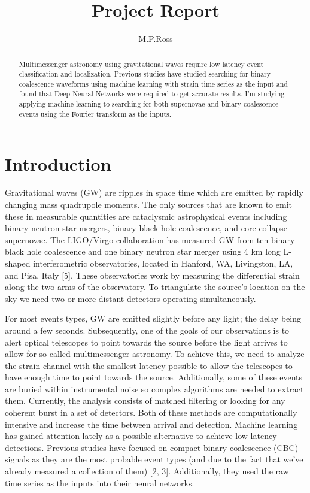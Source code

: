 \documentclass{article}
\title{Project Report}
\author{M.P.Ross}
\begin{document}
\maketitle

\begin{abstract}
Multimessenger astronomy using gravitational waves require low latency event classification and localization. Previous studies have studied searching for binary coalescence waveforms using machine learning with strain time series as the input and found that Deep Neural Networks were required to get accurate results. I'm studying applying machine learning to searching for both supernovae and binary coalescence events using the Fourier transform as the inputs.
\end{abstract}

\section{Introduction}
Gravitational waves (GW) are ripples in space time which are emitted by rapidly changing mass quadrupole moments. The only sources that are known to emit these in measurable quantities are cataclysmic astrophysical events including binary neutron star mergers, binary black hole coalescence, and core collapse supernovae. The LIGO/Virgo collaboration has measured GW from ten binary black hole coalescence and one binary neutron star merger using 4 km long L-shaped interferometric observatories, located in Hanford, WA, Livingston, LA, and Pisa, Italy [5]. These observatories work by measuring the differential strain along the two arms of the observatory. To triangulate the source's location on the sky we need two or more distant detectors operating simultaneously.

For most events types, GW are emitted slightly before any light; the delay being around a few seconds. Subsequently, one of the goals of our observations is to alert optical telescopes to point towards the source before the light arrives to allow for so called multimessenger astronomy. To achieve this, we need to analyze the strain channel with the smallest latency possible to allow the telescopes to have enough time to point towards the source. Additionally, some of these events are buried within instrumental noise so complex algorithms are needed to extract them. Currently, the analysis consists of matched filtering or looking for any coherent burst in a set of detectors. Both of these methods are computationally intensive and increase the time between arrival and detection. Machine learning has gained attention lately as a possible alternative to achieve low latency detections. Previous studies have focused on compact binary coalescence (CBC) signals as they are the most probable event types (and due to the fact that we've already measured a collection of them) [2, 3]. Additionally, they used the raw time series as the inputs into their neural networks. 
\end{document}
